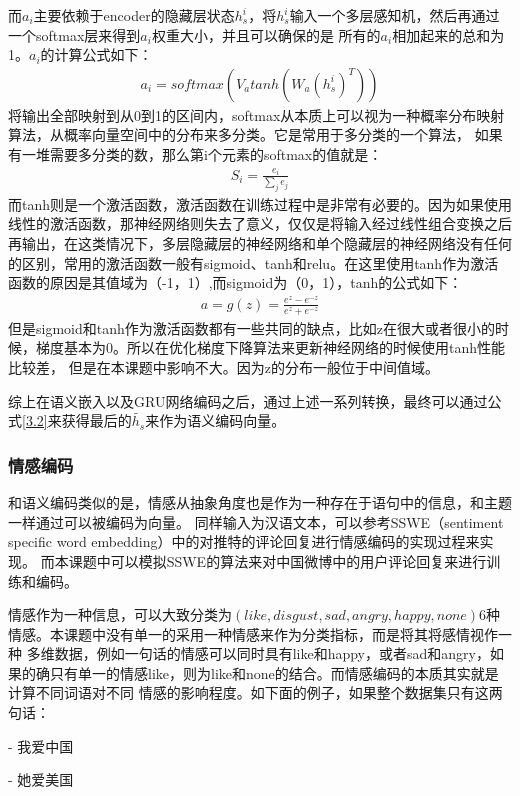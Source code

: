 \documentclass[supercite]{HustGraduPaper}
\theoremstyle{definition}
\begin{document}
而$a_i$主要依赖于encoder的隐藏层状态$h_s^i$，将$h_s^i$输入一个多层感知机，然后再通过一个softmax层来得到$a_i$权重大小，并且可以确保的是
所有的$a_i$相加起来的总和为1。$a_i$的计算公式如下：
\begin{align}
  a_i = softmax(V_a tanh(W_a(h_s^i)^T)) \label{3.3}
\end{align}
将输出全部映射到从0到1的区间内，softmax从本质上可以视为一种概率分布映射算法，从概率向量空间中的分布来多分类。它是常用于多分类的一个算法，
如果有一堆需要多分类的数，那么第i个元素的softmax的值就是：
\begin{align}
  S_i = \frac{e_i}{\sum_j e_j}
\end{align}
而tanh则是一个激活函数，激活函数在训练过程中是非常有必要的。因为如果使用线性的激活函数，那神经网络则失去了意义，仅仅是将输入经过线性组合变换之后
再输出，在这类情况下，多层隐藏层的神经网络和单个隐藏层的神经网络没有任何的区别，常用的激活函数一般有sigmoid、tanh和relu。在这里使用tanh作为激活
函数的原因是其值域为（-1，1）,而sigmoid为（0，1），tanh的公式如下：
\begin{align}
  a = g(z) = \frac{e^z - e^{-z}}{e^z + e^{-z}}
\end{align}
但是sigmoid和tanh作为激活函数都有一些共同的缺点，比如z在很大或者很小的时候，梯度基本为0。所以在优化梯度下降算法来更新神经网络的时候使用tanh性能比较差，
但是在本课题中影响不大。因为z的分布一般位于中间值域。

综上在语义嵌入以及GRU网络编码之后，通过上述一系列转换，最终可以通过公式\ref{3.2}来获得最后的$\widetilde{h_s}$来作为语义编码向量。

\subsubsection{情感编码}
和语义编码类似的是，情感从抽象角度也是作为一种存在于语句中的信息，和主题一样通过可以被编码为向量。
同样输入为汉语文本，可以参考SSWE\cite{tang-etal-2014-learning}（sentiment specific word embedding）中的对推特的评论回复进行情感编码的实现过程来实现。
而本课题中可以模拟SSWE\cite{tang-etal-2014-learning}的算法来对中国微博中的用户评论回复来进行训练和编码。

情感作为一种信息，可以大致分类为$(like, disgust, sad, angry, happy, none)$6种情感。本课题中没有单一的采用一种情感来作为分类指标，而是将其将感情视作一种
多维数据，例如一句话的情感可以同时具有like和happy，或者sad和angry，如果的确只有单一的情感like，则为like和none的结合。而情感编码的本质其实就是计算不同词语对不同
情感的影响程度。如下面的例子，如果整个数据集只有这两句话：

\begin{shaded*}
    - 我爱中国

    - 她爱美国
\end{shaded*}
\end{document}
